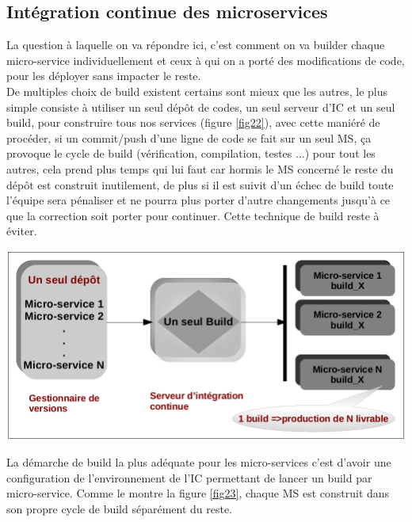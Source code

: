 \documentclass[12pt, a4paper, openany]{report}
\begin{document}
\begin{appendices}
 \section{Intégration continue des microservices}
 
   La question à laquelle on va répondre ici, c'est comment on va builder chaque micro-service individuellement et ceux à qui on a porté des modifications de code, pour les déployer sans impacter le reste. \\
  
  De multiples choix de build existent certains sont mieux que les autres, le plus simple consiste à utiliser un seul dépôt de codes, un seul serveur d'IC et un seul build, pour construire tous nos services (figure \ref{fig22}), avec cette maniéré de procéder, si un commit/push d'une ligne de code se fait sur un seul MS, ça provoque le cycle de build (vérification, compilation, testes ...) pour tout les autres, cela prend plus temps qui lui faut car hormis le MS concerné le reste du dépôt est construit inutilement, de plus si il est suivit d'un échec de build toute l’équipe sera pénaliser et ne pourra plus porter d'autre changements jusqu'à ce que la correction soit porter pour continuer. Cette technique de build reste à éviter.\\
  
  \begin{center}
    \includegraphics[scale=0.3]{itegra_conti_1_22.png}
    \label{fig22}
  \end{center} 
  
  La démarche de build la plus adéquate pour les micro-services c'est d'avoir une configuration de l’environnement de l'IC permettant de lancer un build par micro-service. Comme le montre la figure \ref{fig23}, chaque MS est construit dans son propre cycle de build séparément du reste.
  

\end{appendices}
\end{document}
